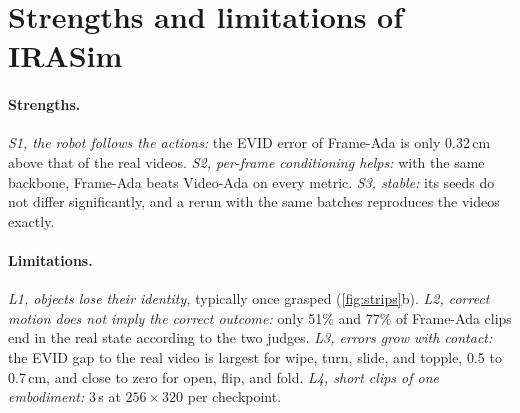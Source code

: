 \section{Strengths and limitations of IRASim}
\label{sec:analysis}

\paragraph{Strengths.}
\textit{S1, the robot follows the actions:} the EVID error of Frame-Ada is only 0.32\,cm above that of the real videos.
\textit{S2, per-frame conditioning helps:} with the same backbone, Frame-Ada beats Video-Ada on every metric.
\textit{S3, stable:} its seeds do not differ significantly, and a rerun with the same batches reproduces the videos exactly.

\paragraph{Limitations.}
\textit{L1, objects lose their identity,} typically once grasped (\cref{fig:strips}b).
\textit{L2, correct motion does not imply the correct outcome:} only 51\% and 77\% of Frame-Ada clips end in the real state according to the two judges.
\textit{L3, errors grow with contact:} the EVID gap to the real video is largest for wipe, turn, slide, and topple, 0.5 to 0.7\,cm, and close to zero for open, flip, and fold.
\textit{L4, short clips of one embodiment:} 3\,s at $256\times320$ per checkpoint.
